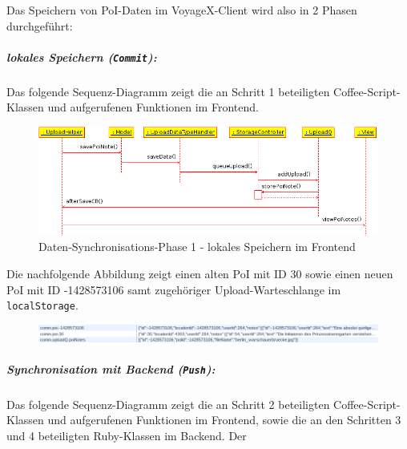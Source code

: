 Das Speichern von PoI-Daten im VoyageX-Client wird also in 2 Phasen durchgeführt:\\
\subparagraph{lokales Speichern (\texttt{Commit}):}
Das folgende Sequenz-Diagramm zeigt die an Schritt 1 beteiligten Coffee-Script-Klassen und aufgerufenen Funktionen im Frontend.
\enlargethispage{2\baselineskip} %
  \begin{figure}[H]
  	\begin{adjustwidth}{-0.3cm}{0.3cm}
      \centering
  	  \includegraphics[scale=0.7]{bilder/uml/queuePoiNote.png}
  	  \caption{Daten-Synchronisations-Phase 1 - lokales Speichern im Frontend}
  	\end{adjustwidth}
  \end{figure}
\noindent
Die nachfolgende Abbildung zeigt einen alten PoI mit ID 30 sowie einen neuen PoI mit ID -1428573106 samt zugehöriger Upload-Warteschlange im \texttt{localStorage}.
  \begin{figure}[H]
  	\begin{adjustwidth}{-0.4cm}{0.4cm}
      \centering
  	  \includegraphics[scale=0.7]{bilder/screenshots/queue_localStrorage_1.png}
  	\end{adjustwidth}
  \end{figure}
\vspace{1ex}
\subparagraph{Synchronisation mit Backend (\texttt{Push}):}
Das folgende Sequenz-Diagramm zeigt die an Schritt 2 beteiligten Coffee-Script-Klassen und aufgerufenen Funktionen im Frontend, sowie die an den Schritten 3 und 4 beteiligten Ruby-Klassen im Backend. Der 
